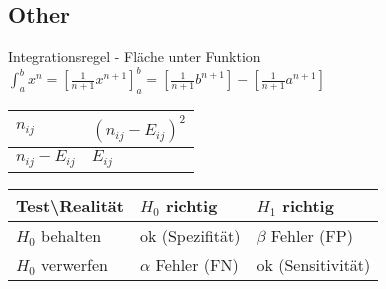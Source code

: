 \documentclass[a4paper]{article}
\begin{document}
\begin{landscape}
\begin{multicols}{4}
    \section*{Other}
    Integrationsregel - Fläche unter Funktion 
    $\int_a^b x^n = [\frac{1}{n+1}x^{n+1}]^b_a = [\frac{1}{n+1}b^{n+1}]-[\frac{1}{n+1}a^{n+1}]$
    \begin{center}
        \begin{tabular}{l|l}
            $n_{ij}$ & $(n_{ij}-E_{ij})^2$           \\ \hline
            $n_{ij}-E_{ij}$           & $E_{ij}$
            \end{tabular}
    \end{center}
    \begin{center}
        \begin{tabular}{|l|l|l|}
            Test\textbackslash{}Realität & $H_0$ richtig                           & $H_1$ richtig       \\ \hline
            $H_0$ behalten                  & \multicolumn{1}{l|}{ok (Spezifität)} & $\beta$ Fehler (FP)     \\ \hline 
            $H_0$ verwerfen                 & \multicolumn{1}{l|}{$\alpha$ Fehler (FN)}    & ok (Sensitivität) 
            \end{tabular}
    \end{center}
    
    \end{multicols}
\end{landscape}
\end{document}
